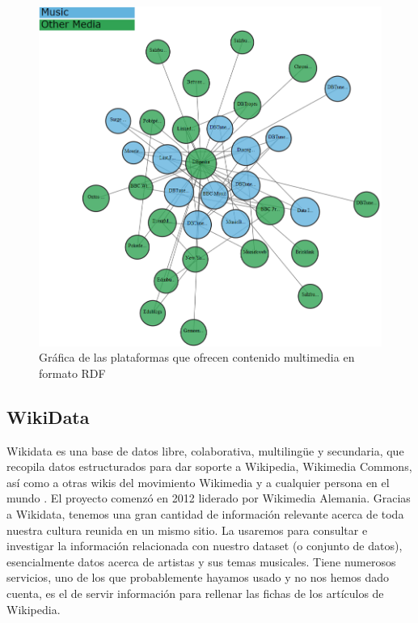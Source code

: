 \begin{figure}[h!]
	\centering
	\includegraphics[width = 1\textwidth]{Imagenes/Bitmap/WIkis.png}
	\caption{Gráfica de las plataformas que ofrecen contenido multimedia en formato RDF}
	\label{fig:sampleImage}
\end{figure}


\subsection{WikiData}

Wikidata es una base de datos libre, colaborativa, multilingüe y secundaria, que recopila datos estructurados para dar soporte a Wikipedia, Wikimedia Commons, así como a otras wikis del movimiento Wikimedia y a cualquier persona en el mundo \cite{wikidataIntro}. El proyecto comenzó en 2012 liderado por Wikimedia Alemania. Gracias a Wikidata, tenemos una gran cantidad de información relevante acerca de toda nuestra cultura reunida en un mismo sitio. La usaremos para consultar e investigar la información relacionada con nuestro dataset (o conjunto de datos), esencialmente datos acerca de artistas y sus temas musicales. Tiene numerosos servicios, uno de los que probablemente hayamos usado y no nos hemos dado cuenta, es el de servir información para rellenar las fichas de los artículos de Wikipedia.\\

